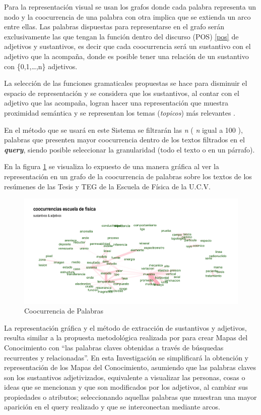 \documentclass[
  10,
  openany]{book}
\begin{document}
Para la representación visual se usan los grafos donde cada palabra representa un nodo y la coocurrencia de una palabra con otra implica que se extienda un arco entre ellas. Las palabras dispuestas para representarse en el grafo serán exclusivamente las que tengan la función dentro del discurso (POS) \ref{pos} de adjetivos y sustantivos, es decir que cada coocurrencia será un sustantivo con el adjetivo que la acompaña, donde es posible tener una relación de un sustantivo con \{0,1,\ldots,n\} adjetivos.

La selección de las funciones gramaticales propuestas se hace para disminuir el espacio de representación y se considera que los sustantivos, al contar con el adjetivo que las acompaña, logran hacer una representación que muestra proximidad semántica y se representan los temas (\emph{topicos}) más relevantes \citep{segev2021}.

En el método que se usará en este Sistema se filtrarán las \emph{n} ( \emph{n} igual a 100 ), palabras que presenten mayor coocurrencia dentro de los textos filtrados en el \textbf{\emph{query}}, siendo posible seleccionar la granularidad (todo el texto o en un párrafo).

En la figura \ref{fig:coocejem} se visualiza lo expuesto de una manera gráfica al ver la representación en un grafo de la coocurrencia de palabras sobre los textos de los resúmenes de las Tesis y TEG de la Escuela de Física de la U.C.V.

\begin{figure}

{\centering \includegraphics[width=0.9\linewidth]{images/03-marco-teorico/cooc} 

}

\caption{Coocurrencia de Palabras}\label{fig:coocejem}
\end{figure}

La representación gráfica y el método de extracción de sustantivos y adjetivos, resulta similar a la propuesta metodológica realizada por \citep{dueñas2011} para crear Mapas del Conocimiento con ``las palabras claves obtenidas a través de búsquedas recurrentes y relacionadas''. En esta Investigación se simplificará la obtención y representación de los Mapas del Conocimiento, asumiendo que las palabras claves son los sustantivos adjetivizados, equivalente a visualizar las personas, cosas o ideas que se mencionan y que son modificados por los adjetivos, al cambiar sus propiedades o atributos; seleccionando aquellas palabras que muestran una mayor aparición en el query realizado y que se interconectan mediante arcos.
\end{document}

